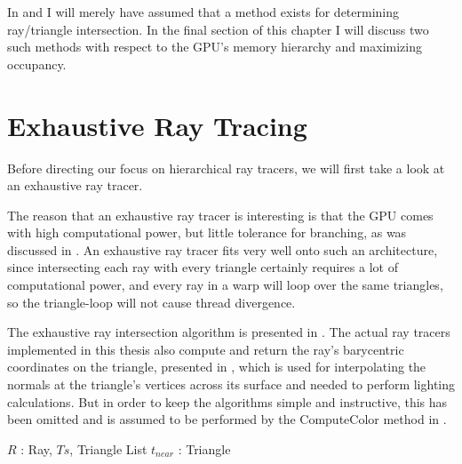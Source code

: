 In  and  I will
merely have assumed that a method exists for determining ray/triangle
intersection. In the final section of this chapter I will discuss two such
methods with respect to the GPU's memory hierarchy and maximizing
occupancy.



\section{Exhaustive Ray Tracing} \label{sec:exhaustive}

Before directing our focus on hierarchical ray tracers, we will first
take a look at an exhaustive ray tracer.


The reason that an exhaustive ray tracer is interesting is that the GPU comes
with high computational power, but little tolerance for branching, as was
discussed in . An exhaustive ray tracer fits
very well onto such an architecture, since intersecting each ray with every
triangle certainly requires a lot of computational power, and every ray in a
warp will loop over the same triangles, so the triangle-loop will not cause
thread divergence.


The exhaustive ray intersection algorithm is presented in
. The actual ray tracers implemented in this thesis also
compute and return the ray's barycentric coordinates on the triangle, presented
in , which is used for interpolating the normals at
the triangle's vertices across its surface and needed to perform lighting
calculations. But in order to keep the algorithms simple and instructive, this
has been omitted and is assumed to be performed by the ComputeColor method in
.


\begin{algorithm}
  \caption{Exhaustive ray tracer}
  \label{alg:exhaustive}
  \begin{algorithmic}
              {$R$ : Ray, $Ts$, Triangle List}
              {$t_{near}$ : Triangle}{
                \ENDFOR
              }
  \end{algorithmic}
\end{algorithm}

